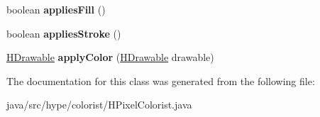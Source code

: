 \begin{DoxyCompactItemize}
\item 
\hypertarget{classhype_1_1colorist_1_1_h_pixel_colorist_afe98f142c8f7cb50fcabb699439e3689}{boolean {\bfseries applies\-Fill} ()}\label{classhype_1_1colorist_1_1_h_pixel_colorist_afe98f142c8f7cb50fcabb699439e3689}

\item 
\hypertarget{classhype_1_1colorist_1_1_h_pixel_colorist_abf0844521b1d35214690d8dfd821a246}{boolean {\bfseries applies\-Stroke} ()}\label{classhype_1_1colorist_1_1_h_pixel_colorist_abf0844521b1d35214690d8dfd821a246}

\item 
\hypertarget{classhype_1_1colorist_1_1_h_pixel_colorist_a2184f6eb74d52cf9d56bae51785f4958}{\hyperlink{classhype_1_1drawable_1_1_h_drawable}{H\-Drawable} {\bfseries apply\-Color} (\hyperlink{classhype_1_1drawable_1_1_h_drawable}{H\-Drawable} drawable)}\label{classhype_1_1colorist_1_1_h_pixel_colorist_a2184f6eb74d52cf9d56bae51785f4958}

\end{DoxyCompactItemize}


The documentation for this class was generated from the following file\-:\begin{DoxyCompactItemize}
\item 
java/src/hype/colorist/H\-Pixel\-Colorist.\-java\end{DoxyCompactItemize}
